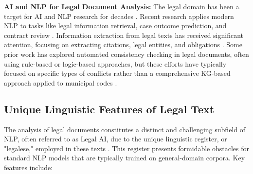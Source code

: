 \textbf{AI and NLP for Legal Document Analysis:}
The legal domain has been a target for AI and NLP research for decades \parencite{RefWorks:RefID:159-ashley2017artificial}. Recent research applies modern NLP to tasks like legal information retrieval, case outcome prediction, and contract review \parencite{RefWorks:RefID:45-moens2001innovative, RefWorks:RefID:164-aletras2016predicting, RefWorks:RefID:64-2022lexglue}. Information extraction from legal texts has received significant attention, focusing on extracting citations, legal entities, and obligations \parencite{RefWorks:RefID:125-kalamkar2022named, RefWorks:RefID:77-tauqeer2022automated}. Some prior work has explored automated consistency checking in legal documents, often using rule-based or logic-based approaches, but these efforts have typically focused on specific types of conflicts rather than a comprehensive KG-based approach applied to municipal codes \parencite{RefWorks:RefID:54-rossi2016inconsistent}.

\subsection{Unique Linguistic Features of Legal Text}
\label{subsec:legal_linguistics}
The analysis of legal documents constitutes a distinct and challenging subfield of NLP, often referred to as Legal AI, due to the unique linguistic register, or "legalese," employed in these texts \parencite{RefWorks:RefID:159-ashley2017artificial}. This register presents formidable obstacles for standard NLP models that are typically trained on general-domain corpora. Key features include:

